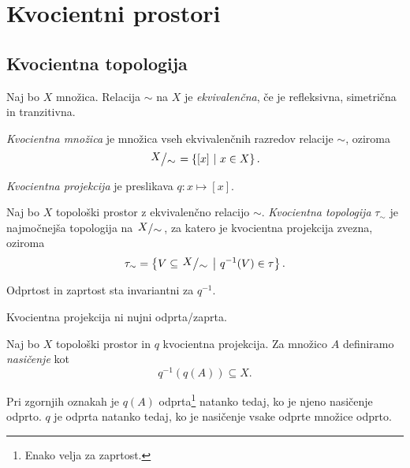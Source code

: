 \section{Kvocientni prostori}

\subsection{Kvocientna topologija}


\begin{definicija}
Naj bo $X$ množica. Relacija $\sim$ na $X$ je
\emph{ekvivalenčna}, če je refleksivna,
simetrična in tranzitivna.
\end{definicija}

\begin{definicija}
\emph{Kvocientna množica} je množica vseh
ekvivalenčnih razredov relacije $\sim$, oziroma
\[
\kvoc{X}{\sim} = \setb{[x]}{x \in X}.
\]
\end{definicija}

\begin{definicija}
\emph{Kvocientna projekcija} je
preslikava $q \colon x \mapsto [x]$.
\end{definicija}

\begin{definicija}
Naj bo $X$ topološki prostor z ekvivalenčno relacijo $\sim$.
\emph{Kvocientna topologija}
$\tau_\sim$ je najmočnejša topologija na $\kvoc{X}{\sim}$, za
katero je kvocientna projekcija zvezna, oziroma
\[
\tau_\sim = \setb{V \subseteq \kvoc{X}{\sim}}{q^{-1}(V) \in \tau}.
\]
\end{definicija}

\begin{opomba}
Odprtost in zaprtost sta invariantni za $q^{-1}$.
\end{opomba}

\begin{opomba}
Kvocientna projekcija ni nujni odprta/zaprta.
\end{opomba}

\begin{definicija}
Naj bo $X$ topološki prostor in $q$ kvocientna projekcija. Za
množico $A$ definiramo \emph{nasičenje} kot
\[
q^{-1}(q(A)) \subseteq X.
\]
\end{definicija}

\begin{trditev}
Pri zgornjih oznakah je $q(A)$ odprta\footnote{Enako velja za
zaprtost.} natanko tedaj, ko je njeno nasičenje odprto. $q$ je
odprta natanko tedaj, ko je nasičenje vsake odprte množice odprto.
\end{trditev}

